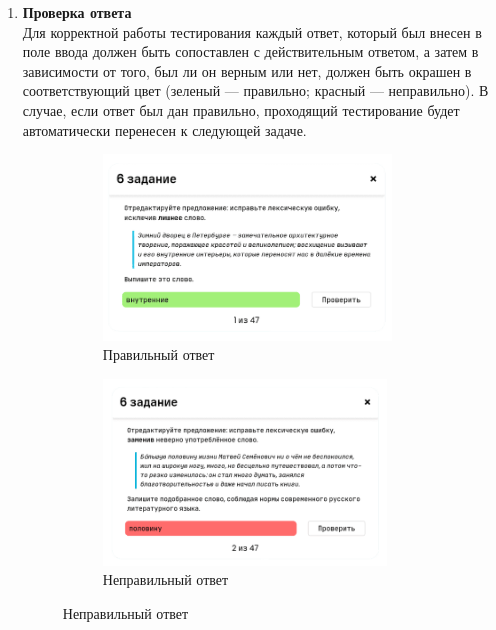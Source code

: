 \documentclass[a4paper, 12pt]{extarticle}
\begin{document}
\begin{enumerate}
\vspace{2mm}
\item {\textbf{Проверка ответа}}\\
    Для корректной работы тестирования каждый ответ, который был внесен в поле
    ввода должен быть сопоставлен с действительным ответом, а затем в
    зависимости от того, был ли он верным или нет, должен быть окрашен в
    соответствующий цвет (зеленый — правильно; красный — неправильно). В
    случае, если ответ был дан правильно, проходящий тестирование будет
    автоматически перенесен к следующей задаче.
    \begin{figure}[h]
        \begin{subfigure}{.5\textwidth}
            \centering
            \includegraphics[height=140pt]{./img/correctAnswer.png}
            \caption{Правильный ответ}
        \end{subfigure}
        \begin{subfigure}{.5\textwidth}
            \centering
            \includegraphics[height=140pt]{./img/incorrectAnswer.png}
            \caption{Неправильный ответ}
        \end{subfigure}
    \end{figure}

\end{enumerate}



\newpage

\newpage
{}
{}

\end{document}
